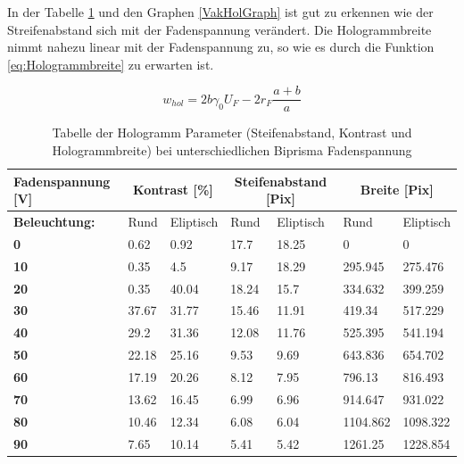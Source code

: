 In der Tabelle \cref{VakHolParameter} und den Graphen \cref{VakHolGraph} ist gut zu erkennen wie der Streifenabstand sich mit der Fadenspannung verändert. Die Hologrammbreite nimmt nahezu linear mit der Fadenspannung zu, so wie es durch die Funktion \cref{eq:Hologrammbreite} zu erwarten ist. 

\begin{equation}
\label{eq:Hologrammbreite}
    w_{hol} = 2b \gamma_0 U_F - 2 r_F \frac{a+b}{a}
\end{equation}

\begin{table}[!ht]
    \centering
    \caption{Tabelle der Hologramm Parameter (Steifenabstand, Kontrast und Hologrammbreite) bei unterschiedlichen Biprisma Fadenspannung}
    \begin{tabular}{|l|l|l|l|l|l|l|}
    \hline
        \textbf{Fadenspannung [V]} & \multicolumn{2}{|c|}{\textbf{Kontrast [\%]}} & \multicolumn{2}{|c|}{\textbf{Steifenabstand [Pix]}} & \multicolumn{2}{|c|}{\textbf{Breite [Pix]}} \\ \hline
        \textbf{Beleuchtung:} & Rund & Eliptisch & Rund & Eliptisch & Rund & Eliptisch \\ \hline
        \textbf{0} & 0.62 & 0.92 & 17.7 & 18.25 & 0 & 0 \\ 
        \textbf{10} & 0.35 & 4.5 & 9.17 & 18.29 & 295.945 & 275.476 \\ 
        \textbf{20} & 0.35 & 40.04 & 18.24 & 15.7 & 334.632 & 399.259 \\ 
        \textbf{30} & 37.67 & 31.77 & 15.46 & 11.91 & 419.34 & 517.229 \\ 
        \textbf{40} & 29.2 & 31.36 & 12.08 & 11.76 & 525.395 & 541.194 \\ 
        \textbf{50} & 22.18 & 25.16 & 9.53 & 9.69 & 643.836 & 654.702 \\ 
        \textbf{60} & 17.19 & 20.26 & 8.12 & 7.95 & 796.13 & 816.493 \\ 
        \textbf{70} & 13.62 & 16.45 & 6.99 & 6.96 & 914.647 & 931.022 \\ 
        \textbf{80} & 10.46 & 12.34 & 6.08 & 6.04 & 1104.862 & 1098.322 \\ 
        \textbf{90} & 7.65 & 10.14 & 5.41 & 5.42 & 1261.25 & 1228.854 \\ \hline
    \end{tabular}
    \label{VakHolParameter}
\end{table}

